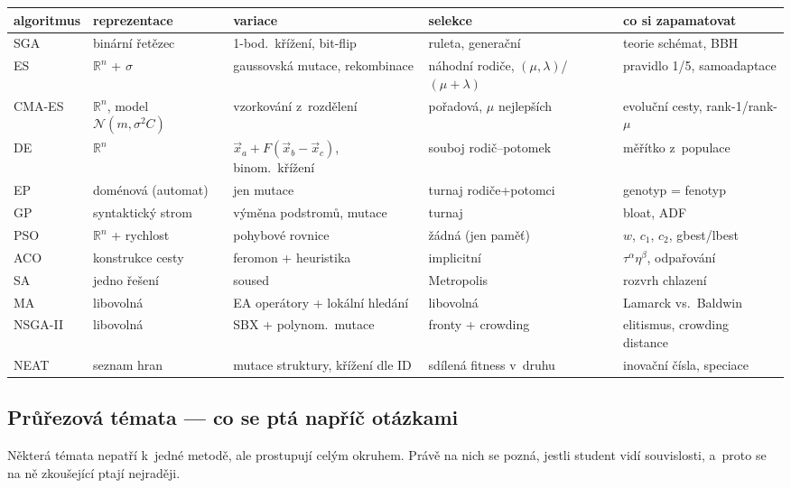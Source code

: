 \documentclass[11pt,a4paper]{article}
\theoremstyle{definition}
\begin{document}
\begin{center}
\small
\begin{tabular}{@{}p{2.5cm}p{2.9cm}p{3.1cm}p{3.1cm}p{3.1cm}@{}}
\toprule
\textbf{algoritmus} & \textbf{reprezentace} & \textbf{variace} &
\textbf{selekce} & \textbf{co si zapamatovat} \\
\midrule
SGA & binární řetězec & 1-bod.\ křížení, bit-flip & ruleta, generační &
  teorie schémat, BBH \\
ES & $\mathbb{R}^n$ + $\sigma$ & gaussovská mutace, rekombinace &
  náhodní rodiče, $(\mu,\lambda)$/$(\mu{+}\lambda)$ & pravidlo 1/5,
  samoadaptace \\
CMA-ES & $\mathbb{R}^n$, model $\mathcal N(m,\sigma^2 C)$ & vzorkování
  z~rozdělení & pořadová, $\mu$ nejlepších & evoluční cesty, rank-1/rank-$\mu$ \\
DE & $\mathbb{R}^n$ & $\vec x_a + F(\vec x_b - \vec x_c)$, binom.\ křížení &
  souboj rodič--potomek & měřítko z~populace \\
EP & doménová (automat) & jen mutace & turnaj rodiče+potomci &
  genotyp = fenotyp \\
GP & syntaktický strom & výměna podstromů, mutace & turnaj &
  bloat, ADF \\
PSO & $\mathbb{R}^n$ + rychlost & pohybové rovnice & žádná (jen paměť) &
  $w$, $c_1$, $c_2$, gbest/lbest \\
ACO & konstrukce cesty & feromon + heuristika & implicitní &
  $\tau^\alpha\eta^\beta$, odpařování \\
SA & jedno řešení & soused & Metropolis & rozvrh chlazení \\
MA & libovolná & EA operátory + lokální hledání & libovolná &
  Lamarck vs.\ Baldwin \\
NSGA-II & libovolná & SBX + polynom.\ mutace & fronty + crowding &
  elitismus, crowding distance \\
NEAT & seznam hran & mutace struktury, křížení dle ID & sdílená fitness
  v~druhu & inovační čísla, speciace \\
\bottomrule
\end{tabular}
\end{center}

\subsection*{Průřezová témata --- co se ptá napříč otázkami}

Některá témata nepatří k~jedné metodě, ale prostupují celým okruhem. Právě na nich se pozná,
jestli student vidí souvislosti, a~proto se na ně zkoušející ptají nejraději.
\end{document}
